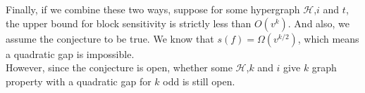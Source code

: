 \documentclass[psamsfonts]{amsart}
\theoremstyle{definition}
\theoremstyle{remark}
\numberwithin{equation}{section}
\begin{document}
		\indent Finally, if we combine these two ways, suppose for some hypergraph $\mathcal{H}$,$i$ and $t$, the upper bound for block sensitivity is strictly less than $O(v^k)$. And also, we assume the conjecture to be true. We know that $s(f) = \Omega(v^{k/2})$, which means a quadratic gap is impossible.\\
		\indent However, since the conjecture is open, whether some $\mathcal{H}$,$k$ and $i$ give $k$ graph property with a quadratic gap for $k$ odd is still open.
\end{document}

